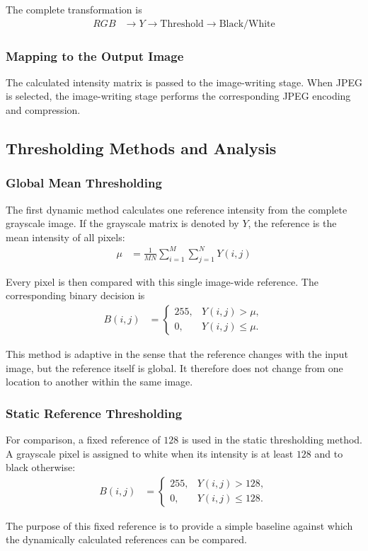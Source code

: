 The complete transformation is
\begin{align}
RGB &\rightarrow Y \rightarrow \text{Threshold}
\rightarrow \text{Black/White}\label{eq:app_rgb_bw_pipeline}
\end{align}

\subsubsection{Mapping to the Output Image}

The calculated intensity matrix is passed to the image-writing stage.
When JPEG is selected, the image-writing stage performs the
corresponding JPEG encoding and compression.

\subsection{Thresholding Methods and Analysis}

\subsubsection{Global Mean Thresholding}

The first dynamic method calculates one reference intensity from the
complete grayscale image. If the grayscale matrix is denoted by $Y$,
the reference is the mean intensity of all pixels:
\begin{align}
\mu &= \frac{1}{MN}\sum_{i=1}^{M}\sum_{j=1}^{N}Y(i,j)\label{eq:app_global_mean}
\end{align}

Every pixel is then compared with this single image-wide reference. The
corresponding binary decision is
\begin{align}
B(i,j)&=
\begin{cases}
255, & Y(i,j)>\mu,\\
0, & Y(i,j)\leq\mu.
\end{cases}\label{eq:app_global_mean_threshold}
\end{align}

This method is adaptive in the sense that the reference changes with the
input image, but the reference itself is global. It therefore does not
change from one location to another within the same image.

\subsubsection{Static Reference Thresholding}

For comparison, a fixed reference of $128$ is used in the static
thresholding method. A grayscale pixel is assigned to white when its
intensity is at least $128$ and to black otherwise:
\begin{align}
B(i,j)&=
\begin{cases}
255, & Y(i,j)>128,\\
0, & Y(i,j)\leq128.
\end{cases}\label{eq:app_static_threshold}
\end{align}

The purpose of this fixed reference is to provide a simple baseline
against which the dynamically calculated references can be compared.

